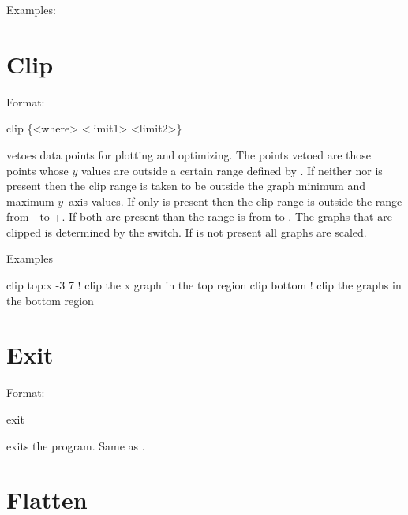 Examples:


\section{Clip}
\label{s:clip}

Format:
\begin{example}
  clip \{<where> <limit1> <limit2>\}
\end{example}

\vskip 0.2in  vetoes data points for plotting and
optimizing. The points vetoed are those points whose $y$ values are
outside a certain range defined by  . If
neither  nor  is present then the clip range
is taken to be outside the graph minimum and maximum $y$--axis
values. If only  is present then the clip range is
outside the range from - to +. If both are
present than the range is from  to .  The
graphs that are clipped is determined by the  switch.  If
 is not present all graphs are scaled.

Examples
\begin{example}
  clip top:x -3  7  ! clip the x graph in the top region
  clip bottom       ! clip the graphs in the bottom region
\end{example}

\section{Exit}
\label{s:exit}

Format:
\begin{example}
  exit
\end{example}

\vskip 0.2in
 exits the program. Same as .

\section{Flatten}
\label{s:flatten}

